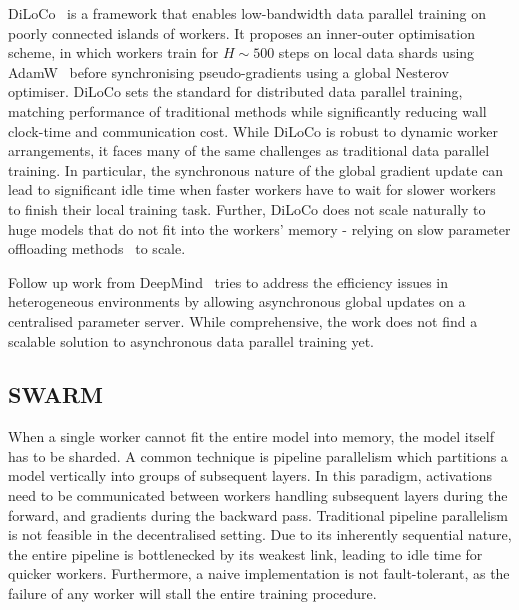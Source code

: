 \documentclass[conference, 10pt]{IEEEtran}
\begin{document}
DiLoCo~\cite{douillard2023} is a framework that enables low-bandwidth data
parallel training on poorly connected islands of workers. It proposes an
inner-outer optimisation scheme, in which workers train for $H\sim 500$ steps on
local data shards using AdamW~\cite{loshchilov2019} before synchronising
pseudo-gradients using a global Nesterov optimiser. DiLoCo sets the standard for
distributed data parallel training, matching performance of traditional methods
while significantly reducing wall clock-time and communication cost. While
DiLoCo is robust to dynamic worker arrangements, it faces many of the same
challenges as traditional data parallel training. In particular, the synchronous
nature of the global gradient update can lead to significant idle time when
faster workers have to wait for slower workers to finish their local training
task. Further, DiLoCo does not scale naturally to huge models that do not fit
into the workers' memory - relying on slow parameter offloading
methods~\cite{rhu2016, cui2016} to scale.

Follow up work from DeepMind~\cite{li2024} tries to address the efficiency
issues in heterogeneous environments by allowing asynchronous global updates on
a centralised parameter server. While comprehensive, the work does not find a
scalable solution to asynchronous data parallel training yet.

\subsection{SWARM}
\label{subsec:swarm}

When a single worker cannot fit the entire model into memory, the model itself
has to be sharded. A common technique is pipeline parallelism which partitions a
model vertically into groups of subsequent layers. In this paradigm, activations
need to be communicated between workers handling subsequent layers during the
forward, and gradients during the backward pass. Traditional pipeline
parallelism is not feasible in the decentralised setting. Due to its inherently
sequential nature, the entire pipeline is bottlenecked by its weakest link,
leading to idle time for quicker workers. Furthermore, a naive implementation is
not fault-tolerant, as the failure of any worker will stall the entire training
procedure.
\end{document}
